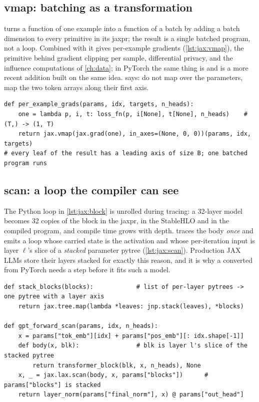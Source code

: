\subsection{vmap: batching as a transformation}
 turns a function of one example into a function of a batch by
adding a batch dimension to every primitive in its jaxpr; the result is a single batched
program, not a loop. Combined with  it gives per-example gradients
(\cref{lst:jax:vmap}), the primitive behind gradient clipping per sample, differential
privacy, and the influence computations of \cref{ch:data}; in PyTorch the same thing is
 and is a more recent addition built on the same
idea.  says: do not map over the parameters, map the two token
arrays along their first axis.

\begin{lstlisting}[caption={Per-example gradients: \code{vmap} of \code{grad} of a one-example loss (\code{basics.per\_example\_grads}).},label={lst:jax:vmap}]
def per_example_grads(params, idx, targets, n_heads):
    one = lambda p, i, t: loss_fn(p, i[None], t[None], n_heads)    # (T,) -> (1, T)
    return jax.vmap(jax.grad(one), in_axes=(None, 0, 0))(params, idx, targets)
# every leaf of the result has a leading axis of size B; one batched program runs
\end{lstlisting}

\subsection{scan: a loop the compiler can see}\label{sec:jax:scan}
The Python loop in \cref{lst:jax:block} is unrolled during tracing: a 32-layer model becomes
32 copies of the block in the jaxpr, in the StableHLO and in the compiled program, and compile
time grows with depth.  traces the body \emph{once} and emits a loop whose
carried state is the activation and whose per-iteration input is layer $\ell$'s slice of a
\emph{stacked} parameter pytree (\cref{lst:jax:scan}). Production JAX LLMs store their layers
stacked for exactly this reason, and it is why a  converted from PyTorch
needs a  step before it fits such a model.

\begin{lstlisting}[caption={The layer loop as \code{lax.scan}: one traced body, stacked parameters (\code{basics.gpt\_forward\_scan}).},label={lst:jax:scan}]
def stack_blocks(blocks):            # list of per-layer pytrees -> one pytree with a layer axis
    return jax.tree.map(lambda *leaves: jnp.stack(leaves), *blocks)

def gpt_forward_scan(params, idx, n_heads):
    x = params["tok_emb"][idx] + params["pos_emb"][: idx.shape[-1]]
    def body(x, blk):                # blk is layer l's slice of the stacked pytree
        return transformer_block(blk, x, n_heads), None
    x, _ = jax.lax.scan(body, x, params["blocks"])      # params["blocks"] is stacked
    return layer_norm(params["final_norm"], x) @ params["out_head"]
\end{lstlisting}

